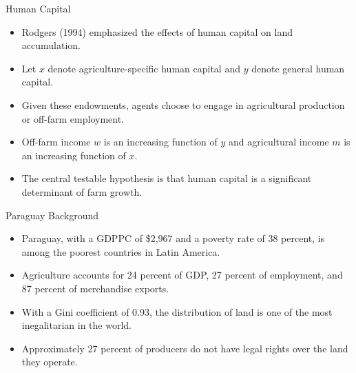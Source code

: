 \documentclass[xcolor=dvipsnames]{beamer}
\begin{document}
\begin{frame}{Human Capital}
\begin{itemize}
\item Rodgers (1994) emphasized the effects of human capital on land 
accumulation. 
\par\pause\noindent \item Let $x$ denote agriculture-specific human 
capital and $y$ denote general human capital.
\par\pause\noindent \item Given these endowments, agents choose to 
engage in agricultural production or off-farm employment.
\par\pause\noindent \item Off-farm income $w$ is an increasing 
function of $y$ and agricultural income $m$ is an increasing function 
of $x$.
\par\pause\noindent \item The central testable hypothesis is that human 
capital is a significant determinant of farm growth.
\end{itemize}
\end{frame}

\begin{frame}{Paraguay Background}
\begin{itemize}
\item Paraguay, with a GDPPC of \$2,967 and a poverty rate of 38 percent, 
is among the poorest countries in Latin America.
\par\pause\noindent \item Agriculture accounts for 24 percent of GDP, 
27 percent of employment, and 87 percent of merchandise exports.
\par\pause\noindent \item With a Gini coefficient of 0.93, the distribution 
of land is one of the most inegalitarian in the world.
\par\pause\noindent \item Approximately 27 percent of producers do not 
have legal rights over the land they operate.
\end{itemize}
\end{frame}
\end{document}
